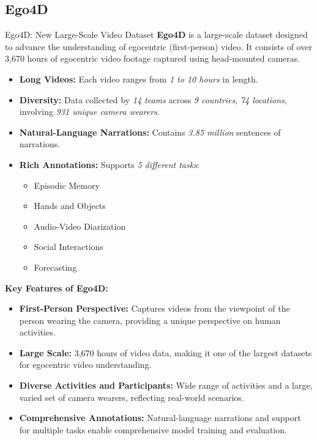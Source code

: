 \subsection{Ego4D}
\begin{frame}[allowframebreaks]{Ego4D: New Large-Scale Video Dataset}
    \textbf{Ego4D} is a large-scale dataset designed to advance the understanding of egocentric (first-person) video. It consists of over 3,670 hours of egocentric video footage captured using head-mounted cameras.

    \begin{itemize}
        \item \textbf{Long Videos:} Each video ranges from \textit{1 to 10 hours} in length.
        \item \textbf{Diversity:} Data collected by \textit{14 teams} across \textit{9 countries}, \textit{74 locations}, involving \textit{931 unique camera wearers}.
        \item \textbf{Natural-Language Narrations:} Contains \textit{3.85 million} sentences of narrations.
        \item \textbf{Rich Annotations:} Supports \textit{5 different tasks}:
        \begin{itemize}
            \setlength{\itemsep}{-0.5em}
            \item Episodic Memory
            \item Hands and Objects
            \item Audio-Video Diarization
            \item Social Interactions
            \item Forecasting
        \end{itemize}
    \end{itemize}
\framebreak
    \textbf{Key Features of Ego4D:}
    \begin{itemize}
        \item \textbf{First-Person Perspective:} Captures videos from the viewpoint of the person wearing the camera, providing a unique perspective on human activities.
        \item \textbf{Large Scale:} 3,670 hours of video data, making it one of the largest datasets for egocentric video understanding.
        \item \textbf{Diverse Activities and Participants:} Wide range of activities and a large, varied set of camera wearers, reflecting real-world scenarios.
        \item \textbf{Comprehensive Annotations:} Natural-language narrations and support for multiple tasks enable comprehensive model training and evaluation.

\end{itemize}
\end{frame}
